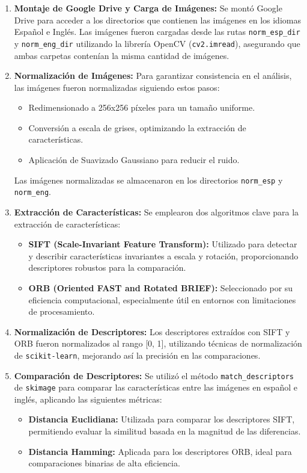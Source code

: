 \documentclass[unnumsec,webpdf,modern,large]{mam-authoring-template}
\theoremstyle{thmstyleone}%
\theoremstyle{thmstyletwo}%
\theoremstyle{thmstylethree}%
\begin{document}
\begin{enumerate}
    \item \textbf{Montaje de Google Drive y Carga de Imágenes:} Se montó Google Drive para acceder a los directorios que contienen las imágenes en los idiomas Español e Inglés. Las imágenes fueron cargadas desde las rutas \texttt{norm\_esp\_dir} y \texttt{norm\_eng\_dir} utilizando la librería OpenCV (\texttt{cv2.imread}), asegurando que ambas carpetas contenían la misma cantidad de imágenes.

    \item \textbf{Normalización de Imágenes:} Para garantizar consistencia en el análisis, las imágenes fueron normalizadas siguiendo estos pasos:
    \begin{itemize}
        \item Redimensionado a 256x256 píxeles para un tamaño uniforme.
        \item Conversión a escala de grises, optimizando la extracción de características.
        \item Aplicación de Suavizado Gaussiano para reducir el ruido.
    \end{itemize}
    Las imágenes normalizadas se almacenaron en los directorios \texttt{norm\_esp} y \texttt{norm\_eng}.

    \item \textbf{Extracción de Características:} Se emplearon dos algoritmos clave para la extracción de características:
    \begin{itemize}
        \item \textbf{SIFT (Scale-Invariant Feature Transform):} Utilizado para detectar y describir características invariantes a escala y rotación, proporcionando descriptores robustos para la comparación.
        \item \textbf{ORB (Oriented FAST and Rotated BRIEF):} Seleccionado por su eficiencia computacional, especialmente útil en entornos con limitaciones de procesamiento.
    \end{itemize}
    
    \item \textbf{Normalización de Descriptores:} Los descriptores extraídos con SIFT y ORB fueron normalizados al rango [0, 1], utilizando técnicas de normalización de \texttt{scikit-learn}, mejorando así la precisión en las comparaciones.

    \item \textbf{Comparación de Descriptores:} Se utilizó el método \texttt{match\_descriptors} de \texttt{skimage} para comparar las características entre las imágenes en español e inglés, aplicando las siguientes métricas:
    \begin{itemize}
        \item \textbf{Distancia Euclidiana:} Utilizada para comparar los descriptores SIFT, permitiendo evaluar la similitud basada en la magnitud de las diferencias.
        \item \textbf{Distancia Hamming:} Aplicada para los descriptores ORB, ideal para comparaciones binarias de alta eficiencia.
    \end{itemize}


\end{enumerate}
\end{document}
